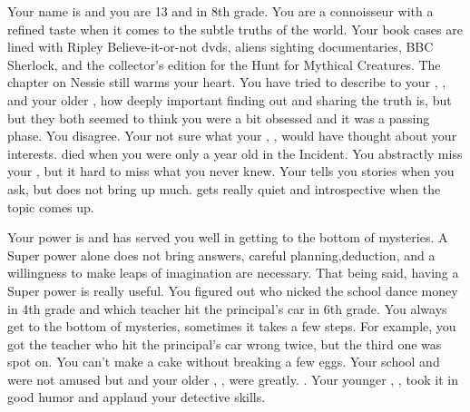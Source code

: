 \documentclass[char]{LRSguildcamp1}
\begin{document}
\name{\cTween{}}


Your name is \cTween{\intro} and you are 13 and in 8th grade. You are a connoisseur with a refined taste when it comes to the subtle truths of the world. Your book cases are lined with Ripley Believe-it-or-not dvds, aliens sighting documentaries,  BBC Sherlock, and the collector's edition for the Hunt for Mythical Creatures. The chapter on Nessie still warms your heart. You have tried to describe to your \cArchitect{\parent}, \cArchitect{}, and your older \cTeen{\sibling}, \cTeen{} how deeply important finding out and sharing the truth is, but but they both seemed to think you were a bit obsessed and it was a passing phase.
You disagree. Your not sure what your \cAS{\parent}, \cAS{}, would have thought about your interests. \cAS{\they} died when you were only a year old in the \pCityO{} Incident. You abstractly miss your \cAS{\parent}, but it hard to miss what you never knew. Your \cArchitect{\parent} tells you stories when you ask, but does not bring \cAS{\them} up much. \cTeen{} gets really quiet and introspective when the topic comes up. 

Your power is \cTween{\MYsuperpower} and has served you well in getting to the bottom of mysteries. A Super power alone does not bring answers, careful planning,deduction, and a willingness to make leaps of imagination are necessary. That being said, having a Super power is really useful. You figured out who nicked the school dance money in 4th grade and which teacher hit the principal's car in 6th grade. You always get to the bottom of mysteries, sometimes it takes a few steps. For example, you got the teacher who hit the principal's car wrong twice, but the third one was spot on. You can't make a cake without breaking a few eggs. Your school and \cArchitect{\parent} were not amused but \cGrandma{} and your older \cOldest{\uncle}, \cOldest{}, were greatly. \cYoungest{}. Your younger \cYoungest{\uncle}, \cYoungest{}, took it in good humor and applaud your detective skills.
\end{document}
